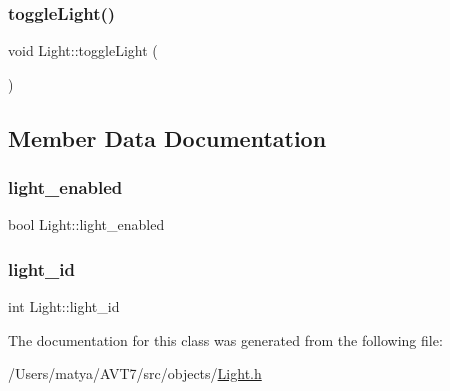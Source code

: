 \subsubsection{\texorpdfstring{toggle\+Light()}{toggleLight()}}
{\footnotesize\ttfamily void Light\+::toggle\+Light (\begin{DoxyParamCaption}{ }\end{DoxyParamCaption})\hspace{0.3cm}{\ttfamily [inline]}}



\subsection{Member Data Documentation}
\mbox{\label{class_light_ab622899f496ea310685e6cbb45977cac}} 
\subsubsection{\texorpdfstring{light\+\_\+enabled}{light\_enabled}}
{\footnotesize\ttfamily bool Light\+::light\+\_\+enabled\hspace{0.3cm}{\ttfamily [protected]}}

\mbox{\label{class_light_ae0028340ad3a9f2e196b68365d5fe972}} 
\subsubsection{\texorpdfstring{light\+\_\+id}{light\_id}}
{\footnotesize\ttfamily int Light\+::light\+\_\+id\hspace{0.3cm}{\ttfamily [protected]}}



The documentation for this class was generated from the following file\+:\begin{DoxyCompactItemize}
\item 
/\+Users/matya/\+A\+V\+T7/src/objects/\hyperlink{_light_8h}{Light.\+h}\end{DoxyCompactItemize}
